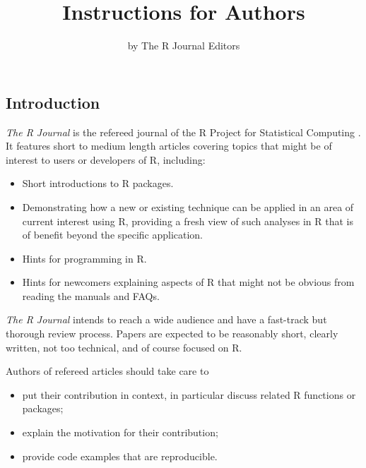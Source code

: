 \documentclass[a4paper]{report}
\begin{document}
\fancyhf{}
\fancyhead[R]{\thepage}

\begin{article}
\title{Instructions for Authors}

\author{by The R Journal Editors}

\maketitle


\section{Introduction}

\emph{The R Journal} is the refereed journal of the R Project for Statistical
Computing \citep{ihaka:1996}.
It features short to medium length articles covering topics
that might be of interest to users or developers of R, including:

\begin{itemize}

\item Short introductions to R packages.

\item Demonstrating how a new or existing technique can be
applied in an area of current interest using R, providing a fresh view
of such analyses in R that is of benefit beyond the specific application.

\item Hints for programming in R.

\item Hints for newcomers explaining aspects of R that might
  not be obvious from reading the manuals and FAQs.

\end{itemize}

\emph{The R Journal} intends to reach a wide audience and have a fast-track
but thorough review process. Papers are expected to be reasonably short,
clearly written, not too technical, and of course focused on R.

Authors of refereed articles should take care to
\begin{itemize}
\item put their contribution in context, in particular discuss related R
  functions or packages;
\item explain the motivation for their contribution;
\item provide code examples that are reproducible.
\end{itemize}


\end{article}
\end{document}
